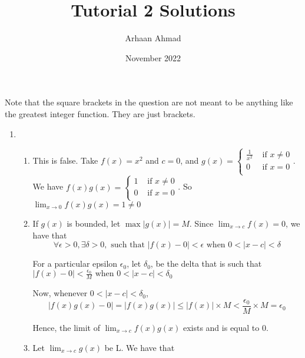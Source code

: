 \documentclass{article}
\title{Tutorial 2 Solutions}
\author{Arhaan Ahmad}
\date{November 2022}
\begin{document}
        \maketitle
                Note that the square brackets in the question are not meant to be anything like the greatest integer function. They are just brackets.
        \begin{enumerate}
                \item \begin{enumerate}
                        \item This is false. Take $f(x) = x^2$ and $c=0$, and 
                                $g(x) = \begin{cases}
                                        \frac{1}{x^2} & \text{ if } x \neq 0\\
                                        0 & \text{ if } x = 0\\
                                \end{cases}$. 
                                We have 
                                $f(x)g(x) = \begin{cases}
                                        1 & \text{ if } x \neq 0\\
                                        0 & \text{ if } x = 0\\
                                \end{cases}$. 
                                So $\lim_{x\to 0} f(x)g(x) = 1 \neq 0$
                         \item If $g(x)$ is bounded, let $\max |g(x)| = M$. 
                                 Since $\lim_{x\to c} f(x) = 0$, we have that 
                                 $$\forall \epsilon > 0, \exists \delta > 0, \text{ such that } |f(x) - 0 | < \epsilon \text{ when } 0 < |x-c| < \delta$$


                                 For a particular epsilon $\epsilon_0$, let $\delta_0$, be the delta that is such that 
                                 $|f(x) - 0 | < \frac{\epsilon_0}{M} \text{ when } 0 < |x-c| < \delta_0$

                                 Now, whenever $0 < |x-c| < \delta_0$, 
                                 $$|f(x)g(x) - 0| = |f(x)g(x)| \leq |f(x)| \times M < \frac{\epsilon_0}{M} \times M = \epsilon_0$$
                                 
                                 Hence, the limit of $\lim_{x\to c}f(x)g(x)$ exists and is equal to $0$.
                         \item Let $\lim_{x \to c} g(x)$ be L. We have that 


\end{enumerate}
\end{enumerate}
\end{document}
